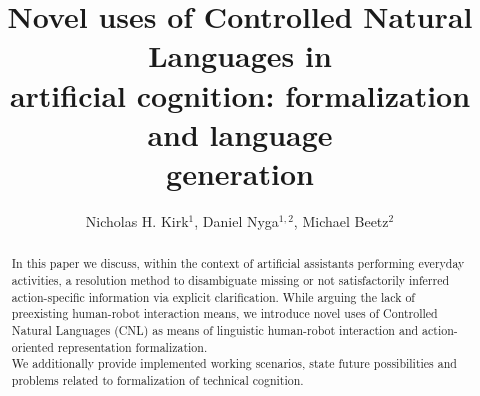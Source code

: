 \documentclass[oribibl]{llncs}
\begin{document}
%
\frontmatter          %
%
\pagestyle{headings}  %
\title{Novel uses of Controlled Natural Languages in\\ artificial cognition: formalization and language\\ generation}
%
\author{Nicholas H. Kirk$^1$, Daniel Nyga$^{1,2}$, Michael Beetz$^2$}
%
%
%
\maketitle              %
\begin{abstract}

In this paper we discuss, within the context of artificial assistants performing everyday activities, a resolution method to disambiguate missing or not satisfactorily inferred action-specific information via explicit clarification.
While arguing the lack of preexisting human-robot interaction means, 
we introduce novel uses of Controlled Natural Languages (CNL)
as means of linguistic human-robot interaction and action-oriented representation formalization.\\
We additionally provide implemented working scenarios, 
state future possibilities and problems related to formalization of technical cognition.

\end{abstract}
\end{document}
